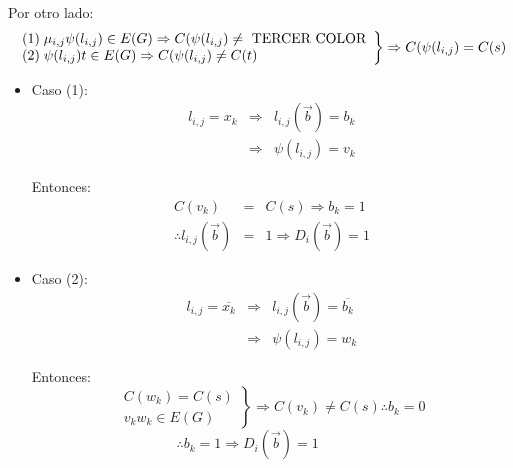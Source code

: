 \documentclass[12pt,a4paper]{report}
\newcounter{neq}
\begin{document}
				\par Por otro lado:
				\begin{equation*}
		  		\left.
		  		\begin{array}{l}
		    	 	(1) \; \mu_{i, j} \psi(l_{i, j}) \in E(G) \Rightarrow C(\psi(l_{i, j}) \neq \textup{ TERCER COLOR} \\
		    	 	(2) \; \psi(l_{i, j}) t \in E(G) \Rightarrow C(\psi(l_{i, j}) \neq C(t)
		  		\end{array}
		 		 	\right\rbrace
		 			\Rightarrow C(\psi(l_{i, j}) = C(s)
				\end{equation*}

				\begin{itemize}
					\item Caso (1):
						\begin{eqnarray}
							\nonumber l_{i, j} = x_{k} &\Rightarrow & l_{i, j}(\overrightarrow{b}) = b_{k} \\
							\nonumber &\Rightarrow& \psi(l_{i, j}) = v_{k}
						\end{eqnarray}
						\par Entonces:
						\begin{eqnarray}
							\nonumber C(v_{k}) &=& C(s) \Rightarrow b_{k} = 1 \\
							\nonumber \therefore l_{i, j}(\overrightarrow{b}) &=& 1 \Rightarrow D_{i}(\overrightarrow{b}) = 1
						\end{eqnarray}
					\item Caso (2):
						\begin{eqnarray}
							\nonumber l_{i, j} = \overline{x_{k}} &\Rightarrow & l_{i, j}(\overrightarrow{b}) = 	\overline{b_{k}} \\
							\nonumber &\Rightarrow& \psi(l_{i, j}) = w_{k}
						\end{eqnarray}
						\par Entonces:
						\begin{equation*}
		  				\left.
		  				\begin{array}{l}
		    		 		C(w_{k}) = C(s) \\
		    		 		v_{k} w_{k} \in E(G)
		  				\end{array}
		 			 		\right\rbrace
		 			 		\Rightarrow C(v_{k}) \neq C(s) \therefore b_{k} = 0
						\end{equation*}
						$\qquad\qquad\qquad\qquad\qquad$
						$\therefore b_{k} = 1 \Rightarrow D_{i}(\overrightarrow{b}) = 1$
				\end{itemize}
\end{document}
